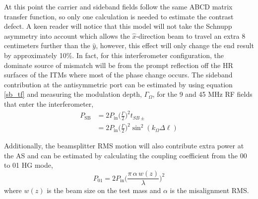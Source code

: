 	At this point the carrier and sideband fields follow the same ABCD matrix transfer function, so only one calculation is needed to estimate the contrast defect.  A keen reader will notice that this model will not take the Schnupp asymmetry into account which allows the $\hat{x}$-direction beam to travel an extra 8 centimeters further than the $\hat{y}$, however, this effect will only change the end result by approximately 10$\%$.  In fact, for this interferometer configuration, the dominate source of mismatch will be from the prompt reflection off the HR surfaces of the ITMs where most of the phase change occurs.  The sideband contribution at the antisymmetric port can be estimated by using equation \ref{sb_tf} and measuring the modulation depth, $\Gamma_{\Omega}$, for the 9 and 45 MHz RF fields that enter the interferometer,
	\begin{equation}
	\begin{aligned}
	P_{\text{SB}}	&= 2 P_{\text{in}} \bigg( \frac{\Gamma}{2} \bigg)^2 t_{SB\pm} \\
	&= 2 P_{\text{in}} \bigg( \frac{\Gamma}{2} \bigg)^2 \sin^2(k_{\Omega} \Delta \ell)
	\end{aligned}
	\end{equation}
	
	Additionally, the beamsplitter RMS motion will also contribute extra power at the AS and can be estimated by calculating the coupling coefficient from the 00 to 01 HG mode,
	\begin{equation}
	P_{01} = 2 P_{\text{in}} \bigg( \frac{\pi \, \alpha \, w(z)}{\lambda}\bigg)^2
	\end{equation}
	where $w(z)$ is the beam size on the test mass and $\alpha$ is the misalignment RMS.
	
